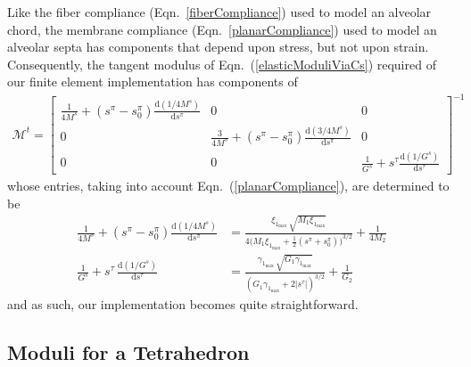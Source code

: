 Like the fiber compliance (Eqn.~\ref{fiberCompliance}) used to model an alveolar chord, the membrane compliance (Eqn.~\ref{planarCompliance}) used to model an alveolar septa has components that depend upon stress, but not upon strain.  Consequently, the tangent modulus of Eqn.~(\ref{elasticModuliViaCs}) required of our finite element implementation has components of
\small
\begin{multline}
    \boldsymbol{\mathcal{M}}^t =  \begin{bmatrix}
    \frac{1}{4M^s} + ( s^{\pi} - s^{\pi}_0 ) \frac{\mathrm{d} (1 / 4M^s)}
    {\mathrm{d} s^{\pi}}
    & 0 & 0 \\
    0 & \frac{3}{4M^s} + ( s^{\pi} - s^{\pi}_0 ) \frac{\mathrm{d} (3 / 4M^s)}
    {\mathrm{d} s^{\pi}} & 0 \\
    0 & 0 & \frac{1}{G^s} + s^{\tau} \frac{\mathrm{d} (1/G^s)}{\mathrm{d} s^{\tau}} 
    \end{bmatrix}^{-1}
    \label{pentagonTangentModulus}
\end{multline}
\normalsize
whose entries, taking into account Eqn.~(\ref{planarCompliance}), are determined to be
\begin{subequations}
    \begin{align}
    \frac{1}{4M^s} + ( s^{\pi} - s^{\pi}_0 ) \frac{\mathrm{d}(1/4M^s)}{\mathrm{d} s^{\pi}} & = \frac{\xi_{1_{\max}} \, \sqrt{M_1 \xi_{1_{\max}}}}
    {4 \bigl( M_1 \xi_{1_{\max}} + \frac{1}{2} ( s^{\pi} + s^{\pi}_0 ) \bigr)^{3/2}}
    + \frac{1}{4M_2} \\
    \frac{1}{G^s} + s^{\tau} \, \frac{\mathrm{d}(1/G^s)}{\mathrm{d} s^{\tau}} & = 
    \frac{\gamma_{1_{\max}} \, \sqrt{G_1 \gamma_{1_{\max}}}}
    {( G_1 \gamma_{1_{\max}} + 2 | s^{\tau} | )^{3/2}} + \frac{1}{G_2}
    \end{align}
\end{subequations}
and as such, our implementation becomes quite straightforward.

\subsection{Moduli for a Tetrahedron}

